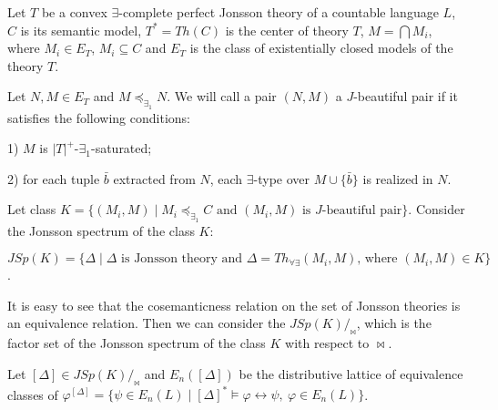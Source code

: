 \documentclass[bsl,meeting]{asl}
\newcommand{\NP}{}
\begin{document}
\thispagestyle{empty}


\NP
{}


Let $T$ be a convex $\exists$-complete perfect Jonsson theory of a countable language $L$, $C$ is its semantic model, $T^*=Th(C)$ is the center of theory $T$, $M=\bigcap M_i$, where $M_i\in E_T$, $M_i\subseteq C$ and $E_T$ is the class of existentially closed models of the theory $T$.

\begin{definition}
Let $N,M\in E_T$ and $M\preceq_{\exists_1} N$. We will call a pair $(N,M)$ a $J$-beautiful pair if it satisfies the following conditions:

1) $M$ is $|T|^+$-$\exists_1$-saturated;

2) for each tuple $\bar{b}$ extracted from $N$, each $\exists$-type over $M\cup\{\bar{b}\}$ is realized in $N$.
\end{definition}

Let class $K=\{(M_i,M)\mid M_i\preceq_{\exists_1}C \text{ and } (M_i,M) \text{ is $J$-beautiful pair}\}$. 
Consider the Jonsson spectrum of the class $K$:
\begin{center}
$JSp(K)=\{\Delta\mid\Delta \text{ is Jonsson theory and } \Delta=Th_{\forall\exists}(M_i,M) \text{, where } (M_i,M)\in K\}$.
\end{center}
It is easy to see that the cosemanticness relation on the set of Jonsson theories is an equivalence relation. Then we can consider the $JSp(K)/_{\bowtie}$, which is the factor set of the Jonsson spectrum of the class $K$ with respect to $\bowtie$.

Let $[\Delta]\in JSp(K)/_{\bowtie}$ and $E_n([\Delta])$ be the distributive lattice of equivalence classes of $\varphi^{[\Delta]}=\{\psi\in E_n(L)\mid [\Delta]^*\models \varphi\leftrightarrow\psi,\ \varphi\in E_n(L)\}$.
\end{document}
